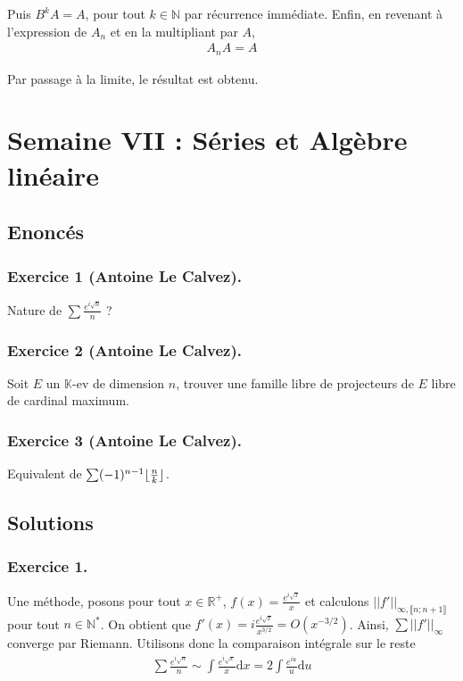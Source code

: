 \documentclass{article}
\DeclarePairedDelimiter{\floor}{\lfloor}{\rfloor}
\begin{document}
	Puis $B^{k}A = A$, pour tout $k\in\mathbb{N}$ par récurrence immédiate. Enfin, en revenant à l'expression de $A_n$ et en la multipliant par $A$,
	\begin{align*}
		A_nA =A
	\end{align*}

	Par passage à la limite, le résultat est obtenu.

	\section{Semaine VII : Séries et Algèbre linéaire}
	\subsection*{Enoncés}
	\subsubsection*{Exercice 1 (Antoine Le Calvez).}
	Nature de $\sum \frac{e^{i\sqrt{n}}}{n}$ ?
	\subsubsection*{Exercice 2 (Antoine Le Calvez).}
	Soit $E$ un $\mathbb{K}$-ev de dimension $n$, trouver une famille libre de projecteurs de $E$ libre de cardinal maximum.
	\subsubsection*{Exercice 3 (Antoine Le Calvez).}
	Equivalent de $\sum (-1)^{n-1} \floor{\frac{n}{k}}$.
	\subsection*{Solutions}
	\subsubsection*{Exercice 1.}
Une méthode, posons pour tout $x \in \mathbb{R}^{+}$, $f(x) = \frac{e^{i\sqrt{x}}}{x}$ et calculons $||f'||_{\infty, \llbracket n; n+1\rrbracket}$ pour tout $n\in \mathbb{N}^*$. On obtient que $f'(x) = i\frac{e^{i\sqrt{x}}}{x^{3/2}} = O(x^{-3/2})$. Ainsi, $\sum ||f'||_{\infty}$ converge par Riemann. Utilisons donc la comparaison intégrale sur le reste 
\begin{align*}
	\sum \frac{e^{i\sqrt{n}}}{n} \sim \int \frac{e^{i\sqrt{x}}}{x}\mathrm{d}x = 2\int \frac{e^{i u}}{u}\mathrm{d}u 
\end{align*}
\end{document}

